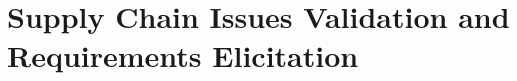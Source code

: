 \chapter{Supply Chain Issues Validation and Requirements Elicitation}
\label{chap:survey}
\minitoc \mtcskip \noindent







